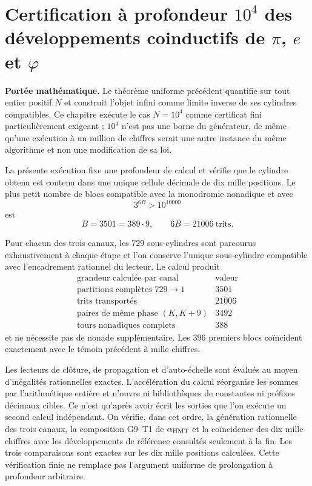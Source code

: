 \section{Certification à profondeur \texorpdfstring{\(10^4\)}{10^4} des développements coinductifs de \texorpdfstring{\(\pi\), \(e\) et \(\varphi\)}{pi, e et phi}}
\label{sec:truncamiento-10000-pi-e-phi-rev9}

\noindent\textbf{Portée mathématique.}
Le théorème uniforme précédent quantifie sur tout entier positif \(N\) et
construit l'objet infini comme limite inverse de ses cylindres compatibles.
Ce chapitre exécute le cas \(N=10^4\) comme certificat fini particulièrement
exigeant ; \(10^4\) n'est pas une borne du générateur, de même qu'une exécution
à un million de chiffres serait une autre instance du même algorithme et non une
modification de sa loi.

La présente exécution fixe une profondeur de calcul et vérifie que le
cylindre obtenu est contenu dans une unique cellule décimale de dix mille
positions. Le plus petit nombre de blocs compatible avec la monodromie nonadique
et avec
\[
  3^{6B}>10^{10000}
\]
est
\[
  B=3501=389\cdot9,
  \qquad 6B=21006\ \text{trits}.
\]

Pour chacun des trois canaux, les \(729\)
sous-cylindres sont parcourus exhaustivement à chaque étape et l'on conserve l'unique sous-cylindre compatible avec l'encadrement
rationnel du lecteur. Le calcul produit
\[
 \begin{array}{c|r}
 \text{grandeur calculée par canal}&\text{valeur}\\
 \hline
 \text{partitions complètes }729\to1&3501\\
 \text{trits transportés}&21006\\
 \text{paires de même phase }(K,K+9)&3492\\
 \text{tours nonadiques complets}&388
 \end{array}
\]
et ne nécessite pas de nonade supplémentaire. Les \(396\) premiers blocs
coïncident exactement avec le témoin précédent à mille chiffres.

Les lecteurs de clôture, de propagation et d'auto-échelle sont évalués au moyen
d'inégalités rationnelles exactes. L'accélération du calcul réorganise les
sommes par l'arithmétique entière et n'ouvre ni bibliothèques de constantes ni préfixes
décimaux cibles. Ce n'est qu'après avoir écrit les sorties que l'on exécute un
second calcul indépendant. On vérifie, dans cet ordre, la
génération rationnelle des trois canaux, la composition G9--T1 de
\(\alpha_{\rm HMT}\) et la coïncidence des dix mille chiffres avec les
développements de référence consultés seulement à la fin. Les trois comparaisons
sont exactes sur les dix mille positions calculées. Cette vérification finie
ne remplace pas l'argument uniforme de prolongation à profondeur arbitraire.

